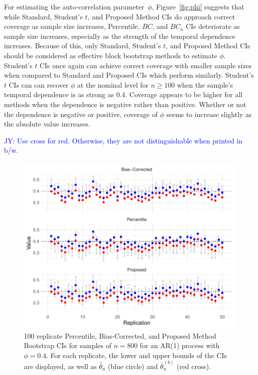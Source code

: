 \documentclass[12pt, letterpaper, titlepage]{article}
\newcommand{\jy}[1]{\textcolor{blue}{JY: #1}}
\begin{document}
For estimating the auto-correlation parameter~$\phi$, Figure~\ref{fig:phi}
suggests that while Standard, Student's $t$, and Proposed Method CIs do
approach correct coverage as sample size increases, Percentile, $BC$, and
$BC_a$ CIs deteriorate as sample size increases, especially as the strength of
the temporal dependence increases. Because of this, only Standard, Student's
$t$, and Proposed Method CIs should be considered as effective block bootstrap
methods to estimate $\phi$. Student's $t$ CIs once again can achieve correct
coverage with smaller sample sizes when compared to Standard and Proposed CIs
which perform similarly. Student's $t$ CIs can can recover $\phi$ at the
nominal level for $n \geq 100$ when the sample's temporal dependence is as
strong as 0.4. Coverage appears to be higher for all methods when the
dependence is negative rather than positive. Whether or not the dependence is
negative or positive, coverage of $\phi$ seems to increase slightly as the
absolute value increases.

\jy{Use cross for red. Otherwise, they are not distinguishable when printed in b/w.}

\begin{figure}[tbp]
  \centering
  \includegraphics[width=\textwidth]{figures/norm_phi_intervals}
  \caption{100 replicate Percentile, Bias-Corrected, and Proposed Method
    Bootstrap CIs for samples of $n = 800$ for an AR(1) process with
    $\phi = 0.4$. For each replicate, the lower and upper bounds of the CIs
    are displayed, as well as $\hat\theta_n$ (blue circle) and
    $\bar\theta_n^{(b)}$ (red cross). }
  \label{fig:npi}
\end{figure}
\end{document}
